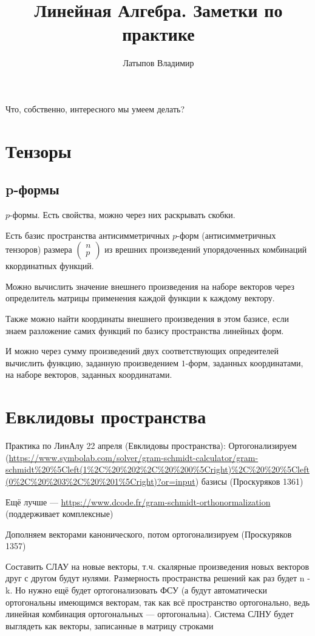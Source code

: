 \documentclass[12pt, a4paper]{article}
\title{Линейная Алгебра. Заметки по практике}
\author{Латыпов Владимир}
\begin{document}
    \tittoc

    Что, собственно, интересного мы умеем делать?

    \section{Тензоры}

    \subsection{p-формы}

    $p$-формы. Есть свойства, можно через них раскрывать скобки.
    
    Есть базис пространства антисимметричных $p$-форм (антисимметричных тензоров) 
    размера $\begin{pmatrix} n \\ p \end{pmatrix}$ из врешних произведений 
    упорядоченных комбинаций ккординатных функций.

    Можно вычислить значение внешнего произведения на наборе векторов через определитель 
    матрицы применения каждой функции к каждому вектору.

    Также можно найти координаты внешнего произведения в этом базисе, 
    если знаем разложение самих функций по базису пространства линейных форм.

    И можно через сумму произведений двух соответствующих опредеителей вычислить функцию, заданную произведением $1$-форм, заданных координатами, 
    на наборе векторов, заданных координатами.


    \section{Евклидовы пространства}

    Практика по ЛинАлу 22 апреля (Евклидовы пространства):
    Ортогонализируем (\url{https://www.symbolab.com/solver/gram-schmidt-calculator/gram-schmidt%20%5Cleft(1%2C%20%202%2C%20%200%5Cright)%2C%20%20%5Cleft(0%2C%20%203%2C%20%201%5Cright)?or=input}) базисы (Проскуряков 1361)

    Ещё лучше — \url{https://www.dcode.fr/gram-schmidt-orthonormalization} (поддерживает комплексные)
    
    Дополняем векторами канонического, потом ортогонализируем (Проскуряков 1357)
    
    Составить СЛАУ на новые векторы, т.ч. скалярные произведения новых векторов друг с другом будут нулями. Размерность пространства решений как раз будет n - k. Но нужно  ещё будет ортогонализовать ФСУ (а будут автоматически ортогональны имеющимся векторам, так как всё пространство ортогонально, ведь линейная комбинация ортогональных — ортогональна). Система СЛНУ будет выглядеть как векторы, записанные в матрицу строками
    
\end{document}
